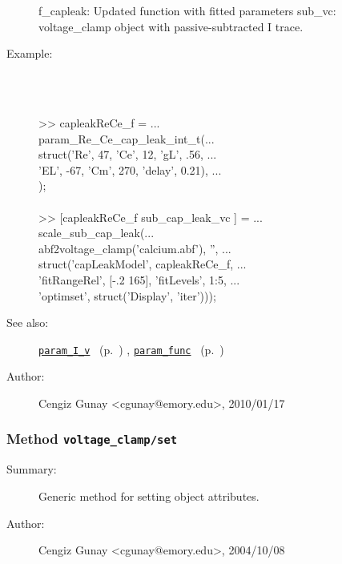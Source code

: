 \begin{description}
   f\_capleak: Updated function with fitted parameters
   sub\_vc: voltage\_clamp object with passive-subtracted I trace.
%
\item[Example:]~
\begin{lyxcode} %
\\%
 >> capleakReCe\_f = ...
\\%
    param\_Re\_Ce\_cap\_leak\_int\_t(...
\\%
      struct('Re', 47, 'Ce', 12, 'gL', .56, ...
\\%
             'EL', -67, 'Cm', 270, 'delay', 0.21), ...
\\%
                         ['cap, leak, Re and Ce']);
\\%
\\%
 >> [capleakReCe\_f sub\_cap\_leak\_vc ] = ...
\\%
    scale\_sub\_cap\_leak(...
\\%
      abf2voltage\_clamp('calcium.abf'), '', ...
\\%
      struct('capLeakModel', capleakReCe\_f, ...
\\%
             'fitRangeRel', [-.2 165], 'fitLevels', 1:5, ...
\\%
             'optimset', struct('Display', 'iter')));
\\%
\end{lyxcode}
%
\item[See also:]%
\hyperlink{ref_param_I_v}{\texttt{param\_I\_v}}%
\ (p.~\pageref{ref_param_I_v})%
%
, \hyperlink{ref_param_func}{\texttt{param\_func}}%
\ (p.~\pageref{ref_param_func})%
%
%
\item[Author:]%
Cengiz Gunay <cgunay@emory.edu>, 2010/01/17
%
\end{description}
\methodline%
\subsubsection[Method \texttt{set}]{Method \texttt{voltage\_clamp/set}}%
%
\label{ref_voltage_clamp__set}%
\hypertarget{ref_voltage_clamp__set}{}%
\begin{description}
\item[Summary:]Generic method for setting object attributes.
%
%
%
%
%
%
%
\item[Author:]%
Cengiz Gunay <cgunay@emory.edu>, 2004/10/08
%
\end{description}
\methodline%
